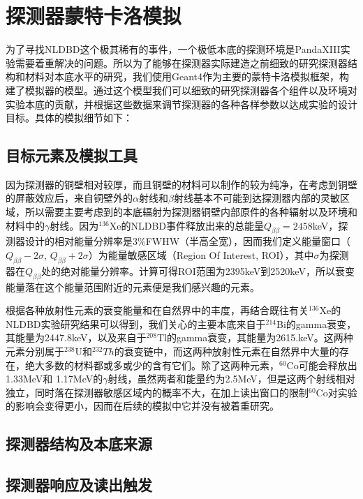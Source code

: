 \chapter{探测器蒙特卡洛模拟}
\label{chapter:background}

为了寻找NLDBD这个极其稀有的事件，一个极低本底的探测环境是PandaXIII实验需要着重解决的问题。所以为了能够在探测器实际建造之前细致的研究探测器结构和材料对本底水平的研究，我们使用Geant4\supercite{Agostinelli:2002hh}作为主要的蒙特卡洛模拟框架，构建了模拟器的模型。通过这个模型我们可以细致的研究探测器各个组件以及环境对实验本底的贡献，并根据这些数据来调节探测器的各种各样参数以达成实验的设计目标。具体的模拟细节如下：

\section{目标元素及模拟工具}

因为探测器的铜壁相对较厚，而且铜壁的材料可以制作的较为纯净，在考虑到铜壁的屏蔽效应后，来自铜壁外的$\alpha$射线和$\beta$射线基本不可能到达探测器内部的灵敏区域，所以需要主要考虑到的本底辐射为探测器铜壁内部原件的各种辐射以及环境和材料中的$\gamma$射线。因为$^{136}$Xe的NLDBD事件释放出来的总能量$Q_{\beta\beta}=2458$keV，探测器设计的相对能量分辨率是3\%FWHW（半高全宽），因而我们定义能量窗口（$Q_{\beta\beta}-2\sigma$, $Q_{\beta\beta}+2\sigma$）为能量敏感区域（Region Of Interest, ROI），其中$\sigma$为探测器在$Q_{\beta\beta}$处的绝对能量分辨率。计算可得ROI范围为2395keV到2520keV，所以衰变能量落在这个能量范围附近的元素便是我们感兴趣的元素。

根据各种放射性元素的衰变能量和在自然界中的丰度，再结合既往有关$^{136}$Xe的
NLDBD实验研究结果可以得到，我们关心的主要本底来自于$^{214}$Bi的gamma衰变，其能量为2447.8keV，以及来自于$^{208}$Tl的gamma衰变，其能量为2615.keV。这两种元素分别属于$^{238}$U和$^{232}Th$的衰变链中，而这两种放射性元素在自然界中大量的存在，绝大多数的材料都或多或少的含有它们。除了这两种元素，$^{60}$Co可能会释放出1.33MeV和
1.17MeV的$\gamma$射线，虽然两者和能量约为2.5MeV，但是这两个射线相对独立，同时落在探测器敏感区域内的概率不大，在加上读出窗口的限制$^{60}$Co对实验的影响会变得更小，因而在后续的模拟中它并没有被着重研究。



\section{探测器结构及本底来源}

\section{探测器响应及读出触发}


